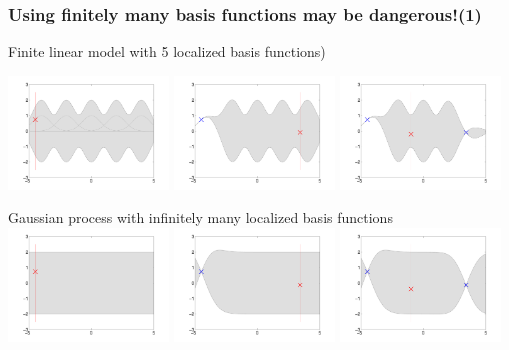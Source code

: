 \begin{frame}
\frametitle{\!\!\!Using finitely many basis functions may be dangerous!(1)}

Finite linear model with 5 localized basis functions)

\includegraphics[width=0.32\textwidth]{seq_linear_M1.pdf}
\includegraphics[width=0.32\textwidth]{seq_linear_M2.pdf}
\includegraphics[width=0.32\textwidth]{seq_linear_M3.pdf}

Gaussian process with infinitely many localized basis functions
\includegraphics[width=0.32\textwidth]{seq_fullGP_M1.pdf}
\includegraphics[width=0.32\textwidth]{seq_fullGP_M2.pdf}
\includegraphics[width=0.32\textwidth]{seq_fullGP_M3.pdf}
\end{frame}

